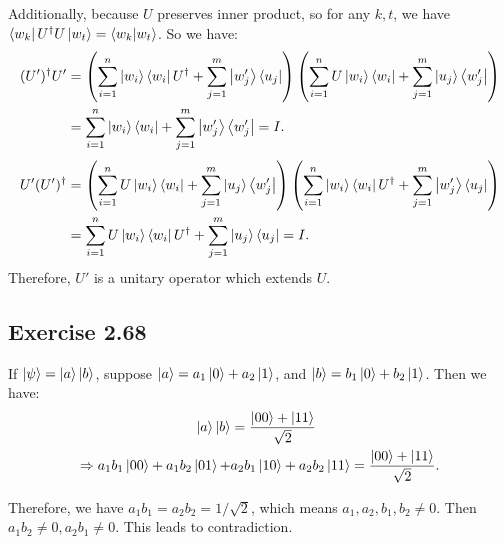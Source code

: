 Additionally, because $U$ preserves inner product, so for any $k,t$, we have $\bra{w_k}U^\dagger U\ket{w_t}=\bra{w_k}\ket{w_t}$. So we have:
\begin{align}
(U')^\dagger U'&=\left(\sum_{i=1}^n \ket{w_i}\bra{w_i}U^\dagger+\sum_{j=1}^m \ket{w_j'}\bra{u_j}\right)\left(\sum_{i=1}^n U\ket{w_i}\bra{w_i}+\sum_{j=1}^m \ket{u_j}\bra{w_j'}\right)\\
&=\sum_{i=1}^n \ket{w_i}\bra{w_i} + \sum_{j=1}^m \ket{w_j'}\bra{w_j'}=I.
\end{align}
\begin{align}
 U'(U')^\dagger&=\left(\sum_{i=1}^n U\ket{w_i}\bra{w_i}+\sum_{j=1}^m \ket{u_j}\bra{w_j'}\right)\left(\sum_{i=1}^n \ket{w_i}\bra{w_i}U^\dagger+\sum_{j=1}^m \ket{w_j'}\bra{u_j}\right)\\
&=\sum_{i=1}^n U\ket{w_i}\bra{w_i}U^\dagger + \sum_{j=1}^m \ket{u_j}\bra{u_j}=I.
\end{align}
Therefore, $U'$ is a unitary operator which extends $U$.

\subsection*{Exercise 2.68}

If $\ket{\psi}=\ket{a}\ket{b}$, suppose $\ket{a}=a_1\ket{0}+a_2\ket{1}$, and $\ket{b}=b_1\ket{0}+b_2\ket{1}$. Then we have:
\begin{align}
\ket{a}\ket{b}&=\frac{\ket{00}+\ket{11}}{\sqrt 2}\\
\Rightarrow a_1b_1\ket{00}+a_1b_2\ket{01}+&a_2b_1\ket{10}+a_2b_2\ket{11}=\frac{\ket{00}+\ket{11}}{\sqrt 2}.
\end{align}

Therefore, we have $a_1b_1=a_2b_2=1/\sqrt 2$, which means $a_1,a_2,b_1,b_2\neq 0$. Then $a_1b_2\neq 0,a_2b_1\neq 0$. This leads to contradiction. 

